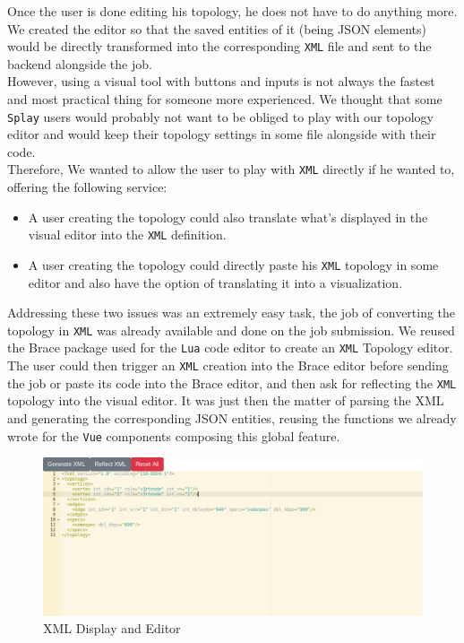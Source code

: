 \documentclass{eplmastersthesis}
\begin{document}
        Once the user is done editing his topology, he does not have to
        do anything more. We created the editor so that the saved entities
        of it (being JSON elements) would be directly transformed into the
        corresponding \texttt{XML} file and sent to the backend alongside the
        job.\\

        However, using a visual tool with buttons and inputs is not always
        the fastest and most practical thing for someone more experienced. We
        thought that some \texttt{Splay} users would probably not want to be obliged
        to play with our topology editor and would keep their topology
        settings in some file alongside with their code.\\
        Therefore, We wanted to allow the user to play with \texttt{XML} directly
        if he wanted to, offering the following service:

        \begin{itemize}
          \item A user creating the topology could also translate what's
          displayed in the visual editor into the \texttt{XML} definition.
          \item A user creating the topology could directly paste
          his \texttt{XML} topology in some editor and also have the option of
          translating it into a visualization.
        \end{itemize}

        Addressing these two issues was an extremely easy task, the job of
        converting the topology in \texttt{XML} was already available and done on
        the job submission. We reused the Brace package used
        for the \texttt{Lua} code editor to create an \texttt{XML} Topology editor.\\
        The user could then trigger an \texttt{XML} creation into the Brace editor
        before sending the job or paste its code into the Brace editor, and
        then ask for reflecting the \texttt{XML} topology into the visual editor. It
        was just then the matter of parsing the XML and generating the
        corresponding JSON entities, reusing the functions we already wrote
        for the \texttt{Vue} components composing this global feature.

        \begin{figure}[H]
          \centering
          \includegraphics[scale=0.5]{figures/xml_topology.png}
          \caption{\label{xml_topology} XML Display and Editor}
        \end{figure}
\end{document}
